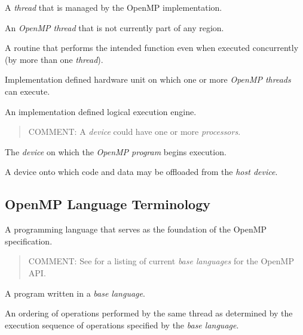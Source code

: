 \glossarydefstart
A \emph{thread} that is managed by the OpenMP implementation.
\glossarydefend

\glossarydefstart
An \emph{OpenMP thread} that is not currently part of any  region.
\glossarydefend

\glossarydefstart
A routine that performs the intended function even when executed concurrently
(by more than one \emph{thread}).
\glossarydefend

\glossarydefstart
Implementation defined hardware unit on which one or more \emph{OpenMP threads} can
execute.
\glossarydefend

\glossarydefstart
An implementation defined logical execution engine.

\begin{quote}
COMMENT: A \emph{device} could have one or more \emph{processors}.
\end{quote}
\glossarydefend

\glossarydefstart
The \emph{device} on which the \emph{OpenMP program} begins execution.
\glossarydefend

\glossarydefstart
A device onto which code and data may be offloaded from the \emph{host device}.
\glossarydefend




\subsection{OpenMP Language Terminology}
\label{subsec:OpenMP Language Terminology}
\glossarydefstart
A programming language that serves as the foundation of the OpenMP
specification.

\begin{quote}
COMMENT: See 
for a listing of current \emph{base languages} for the OpenMP API.
\end{quote}
\glossarydefend

\glossarydefstart
A program written in a \emph{base language}.
\glossarydefend

\glossarydefstart
An ordering of operations performed by the same thread as determined by the
execution sequence of operations specified by the \emph{base language}.


